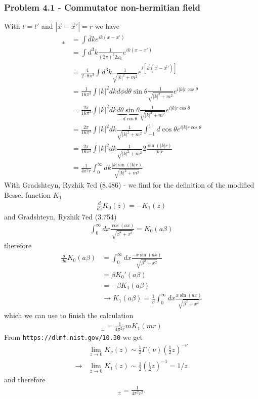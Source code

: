 \documentclass[10pt,a4paper]{article}
\theoremstyle{definition}
\begin{document}
\subsubsection{Problem 4.1 - Commutator non-hermitian field}
With $t=t'$ and $|\vec{x}-\vec{x}'|=r$ we have 
\begin{align}
[\varphi^+(x),\varphi^-(x')]_\pm
&=\int\widetilde{dk}e^{ik(x-x')}\\
&=\int d^3k\frac{1}{(2\pi)^3 2\omega_k}e^{ik(x-x')}\\
&=\frac{1}{2\cdot8\pi^3}\int d^3k\frac{1}{\sqrt{|k|^2+m^2}}e^{i[\vec{k}(\vec{x}-\vec{x}')]}\\
&=\frac{1}{16\pi^3}\int |k|^2dkd\phi d\theta\sin\theta\frac{1}{\sqrt{|k|^2+m^2}}e^{i|k|r\cos\theta}\\
&=\frac{2\pi}{16\pi^3}\int |k|^2dk \underbrace{d\theta\sin\theta}_{-d\cos\theta}\frac{1}{\sqrt{|k|^2+m^2}}e^{i|k|r\cos\theta}\\
&=\frac{2\pi}{16\pi^3}\int |k|^2dk \frac{1}{\sqrt{|k|^2+m^2}}\int_{-1}^1d\cos\theta e^{i|k|r\cos\theta}\\
&=\frac{2\pi}{16\pi^3}\int |k|^2dk \frac{1}{\sqrt{|k|^2+m^2}}2\frac{\sin(|k|r)}{|k|r}\\
&=\frac{1}{4\pi^2r}\int_0^\infty dk \frac{|k|\sin(|k|r)}{\sqrt{|k|^2+m^2}}
\end{align}
With Gradshteyn, Ryzhik 7ed (8.486) - we find for the definition of the modified Bessel function $K_1$ 
\begin{align}
\frac{d}{dz}K_0(z)=-K_1(z)
\end{align}
and Gradshteyn, Ryzhik 7ed (3.754)
\begin{align}
\int_0^\infty dx \frac{\cos(ax)}{\sqrt{\beta^2+x^2}}=K_0(a\beta)
\end{align}
therefore
\begin{align}
\frac{d}{da}K_0(a\beta)&=\int_0^\infty dx \frac{-x\sin(ax)}{\sqrt{\beta^2+x^2}}\\
&=\beta K_0'(a\beta)\\
&=-\beta K_1(a\beta)\\
&\rightarrow K_1(a\beta)=\frac{1}{\beta}\int_0^\infty dx \frac{x\sin(ax)}{\sqrt{\beta^2+x^2}}
\end{align}
which we can use to finish the calculation
\begin{align}
[\varphi^+(x),\varphi^-(x')]_\pm=\frac{1}{4\pi^2r}mK_1(mr)
\end{align}
From \texttt{https://dlmf.nist.gov/10.30} we get
\begin{align}
&\lim_{z\rightarrow0}K_\nu(z)\sim\frac{1}{2}\Gamma(\nu)\left(\frac{1}{2}z\right)^{-\nu}\\
\rightarrow&\lim_{z\rightarrow0}K_1(z)\sim\frac{1}{2}\left(\frac{1}{2}z\right)^{-1}=1/z
\end{align}
and therefore
\begin{align}
[\varphi^+(x),\varphi^-(x')]_\pm=\frac{1}{4\pi^2r^2}.
\end{align}
\end{document}
